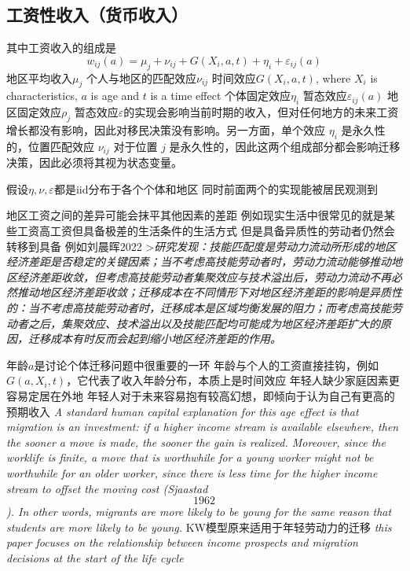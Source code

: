 \documentclass{article}
\numberwithin{equation}{section} %
\begin{document}
\subsection{工资性收入（货币收入）}
其中工资收入的组成是
$$w_{ij}(a)=\mu_j+\nu_{ij}+G(X_i,a,t)+\eta_i+\varepsilon_{ij}(a)$$
地区平均收入$\mu_j$
个人与地区的匹配效应$\nu_{ij}$
时间效应$G(X_{i},a,t)$, where $X_{i}$ is characteristics, $a$ is age and $t$ is a time effect
个体固定效应$\eta_i$
暂态效应$\varepsilon_{ij}(a)$
地区固定效应$\rho_{j}$
暂态效应$\varepsilon$的实现会影响当前时期的收入，但对任何地方的未来工资增长都没有影响，因此对移民决策没有影响。另一方面，单个效应 $\eta_{i}$ 是永久性的，位置匹配效应 $\nu_{ij}$ 对于位置 $j$ 是永久性的，因此这两个组成部分都会影响迁移决策，因此必须将其视为状态变量。

假设$\eta,\nu,\varepsilon$都是iid分布于各个个体和地区
同时前面两个的实现能被居民观测到

地区工资之间的差异可能会抹平其他因素的差距 
例如现实生活中很常见的就是某些工资高工资但具备极差的生活条件的生活方式
但是具备异质性的劳动者仍然会转移到具备
例如刘晨晖2022
>\textit{研究发现：技能匹配度是劳动力流动所形成的地区经济差距是否稳定的关键因素；当不考虑高技能劳动者时，劳动力流动能够推动地区经济差距收敛，但考虑高技能劳动者集聚效应与技术溢出后，劳动力流动不再必然推动地区经济差距收敛；迁移成本在不同情形下对地区经济差距的影响是异质性的：当不考虑高技能劳动者时，迁移成本是区域均衡发展的阻力；而考虑高技能劳动者之后，集聚效应、技术溢出以及技能匹配均可能成为地区经济差距扩大的原因，迁移成本有时反而会起到缩小地区经济差距的作用。}


年龄$a$是讨论个体迁移问题中很重要的一环
年龄与个人的工资直接挂钩，例如$G(a,X_i,t)$，它代表了收入年龄分布，本质上是时间效应
年轻人缺少家庭因素更容易定居在外地
年轻人对于未来容易抱有较高幻想，即倾向于认为自己有更高的预期收入
\textit{A standard human capital explanation for this age effect is that migration is an investment: if a higher income stream is  available elsewhere, then the sooner a move is made, the sooner the gain is realized. Moreover,  since the worklife is finite, a move that is worthwhile for a young worker might not be  worthwhile for an older worker, since there is less time for the higher income stream to offset  the moving cost (Sjaastad \[1962\]). In other words, migrants are more likely to be young for the same reason that students are more likely to be young.}
KW模型原来适用于年轻劳动力的迁移
\textit{this paper focuses on the relationship between income prospects and migration decisions at the start of the life cycle}
\end{document}
